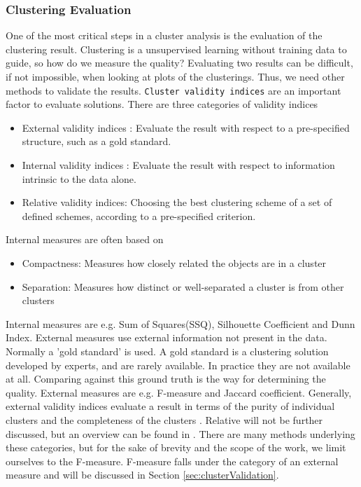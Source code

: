 \documentclass[a4paper,10pt]{article}
\theoremstyle{plain}
\theoremstyle{definition}
\begin{document}
\subsubsection{Clustering Evaluation}
One of the most critical steps in a cluster analysis is the evaluation of the clustering result. Clustering is a unsupervised learning without training data to guide, so how do we measure the quality? Evaluating two results can be difficult, if not impossible, when looking at plots of the clusterings. Thus, we need other methods to validate the results. \texttt{Cluster validity indices} are an important factor to evaluate solutions. There are three categories of validity indices \cite{onClustTechniques}
\begin{itemize}
	\item External validity indices : Evaluate the result with respect to a pre-specified structure, such as a gold standard. 
	\item Internal validity indices : Evaluate the result with respect to information intrinsic to the data alone.
	\item Relative validity indices: Choosing the best clustering scheme of a set of defined schemes, according to a pre-specified criterion.
\end{itemize}
Internal measures are often based on
\begin{itemize}
	\item Compactness: Measures how closely related the objects are in a cluster
	\item Separation: Measures how distinct or well-separated a cluster is from other clusters
\end{itemize}
Internal measures are e.g. Sum of Squares(SSQ), Silhouette Coefficient and Dunn Index. External measures use external information not present in the data. Normally a 'gold standard' is used. A gold standard is a clustering solution developed by experts, and are rarely available. In practice they are not available at all. Comparing against this ground truth is the way for determining the quality. External measures are e.g. F-measure and Jaccard coefficient. Generally, external validity indices evaluate a result in terms of the purity of individual clusters and the completeness of the clusters \cite{powerLimits}. Relative will not be further discussed, but an overview can be found in \cite{onClustTechniques}. There are many methods underlying these categories, but for the sake of brevity and the scope of the work, we limit ourselves to the F-measure. F-measure falls under the category of an external measure and will be discussed in Section \ref{sec:clusterValidation}.
\end{document}
